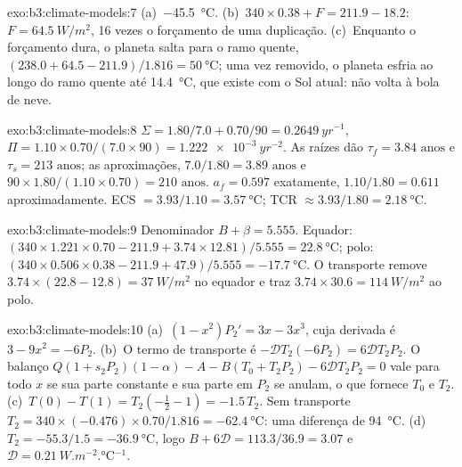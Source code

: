 \begin{solution}{exo:b3:climate-models:7}
(a)~\qty{-45.5}{\celsius}. (b)~$340\times0.38 + F = 211.9 - 18.2$: $F =
\qty{64.5}{W/m^2}$, 16 vezes o forçamento de uma duplicação. (c)~Enquanto o
forçamento dura, o planeta salta para o ramo quente, $(238.0 + 64.5 -
211.9)/1.816 = \qty{50}{\celsius}$; uma vez removido, o planeta esfria
ao longo do ramo quente até \qty{14.4}{\celsius}, que existe com o Sol atual:
não volta à bola de neve.
\end{solution}

\begin{solution}{exo:b3:climate-models:8}
$\Sigma = 1.80/7.0 + 0.70/90 = \qty{0.2649}{yr^{-1}}$, $\Pi = 1.10\times0.70/
(7.0\times90) = \qty{1.222e-3}{yr^{-2}}$. As raízes dão $\tau_f =
\num{3.84}\text{ anos}$ e $\tau_s = \num{213}\text{ anos}$; as aproximações,
$7.0/1.80 = \num{3.89}\text{ anos}$ e $90\times1.80/(1.10\times0.70) =
\num{210}\text{ anos}$. $a_f = 0.597$ exatamente, $1.10/1.80 = 0.611$
aproximadamente. ECS $= 3.93/1.10 = \qty{3.57}{\celsius}$; TCR $\approx
3.93/1.80 = \qty{2.18}{\celsius}$.
\end{solution}

\begin{solution}{exo:b3:climate-models:9}
Denominador $B + \beta = \num{5.555}$. Equador: $(340\times1.221\times0.70 -
211.9 + 3.74\times12.81)/5.555 = \qty{22.8}{\celsius}$; polo:
$(340\times0.506\times0.38 - 211.9 + 47.9)/5.555 = \qty{-17.7}{\celsius}$.
O transporte remove $3.74\times(22.8 - 12.8) = \qty{37}{W/m^2}$ no
equador e traz $3.74\times30.6 = \qty{114}{W/m^2}$ ao polo.
\end{solution}

\begin{solution}{exo:b3:climate-models:10}
(a)~$(1 - x^2)P_2' = 3x - 3x^3$, cuja derivada é $3 - 9x^2 = -6P_2$.
(b)~O termo de transporte é $-\mathcal D T_2(-6P_2) = 6\mathcal DT_2P_2$.
O balanço $Q(1 + s_2P_2)(1 - \alpha) - A - B(T_0 + T_2P_2) - 6\mathcal
DT_2P_2 = 0$ vale para todo $x$ se sua parte constante e sua parte em $P_2$
se anulam, o que fornece $T_0$ e $T_2$. (c)~$T(0) - T(1) = T_2(-\tfrac12 - 1)
= -1.5\,T_2$. Sem transporte $T_2 = 340\times(-0.476)\times0.70/1.816 =
\qty{-62.4}{\celsius}$: uma diferença de \qty{94}{\celsius}. (d)~$T_2 =
-55.3/1.5 = \qty{-36.9}{\celsius}$, logo $B + 6\mathcal D = 113.3/36.9 =
3.07$ e $\mathcal D = \qty{0.21}{W.m^{-2}.\celsius^{-1}}$.
\end{solution}


